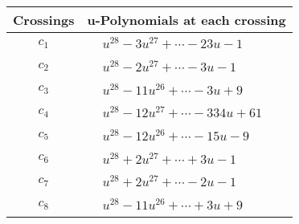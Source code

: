 \documentclass[1p]{elsarticle_modified}
\theoremstyle{definition}
\begin{document}
\begin{tabular}{m{50pt}|m{274pt}}
Crossings & \hspace{64pt}u-Polynomials at each crossing \\
\hline $$\begin{aligned}c_{1}\end{aligned}$$&$\begin{aligned}
&u^{28}-3 u^{27}+\cdots-23 u-1
\end{aligned}$\\
\hline $$\begin{aligned}c_{2}\end{aligned}$$&$\begin{aligned}
&u^{28}-2 u^{27}+\cdots-3 u-1
\end{aligned}$\\
\hline $$\begin{aligned}c_{3}\end{aligned}$$&$\begin{aligned}
&u^{28}-11 u^{26}+\cdots-3 u+9
\end{aligned}$\\
\hline $$\begin{aligned}c_{4}\end{aligned}$$&$\begin{aligned}
&u^{28}-12 u^{27}+\cdots-334 u+61
\end{aligned}$\\
\hline $$\begin{aligned}c_{5}\end{aligned}$$&$\begin{aligned}
&u^{28}-12 u^{26}+\cdots-15 u-9
\end{aligned}$\\
\hline $$\begin{aligned}c_{6}\end{aligned}$$&$\begin{aligned}
&u^{28}+2 u^{27}+\cdots+3 u-1
\end{aligned}$\\
\hline $$\begin{aligned}c_{7}\end{aligned}$$&$\begin{aligned}
&u^{28}+2 u^{27}+\cdots-2 u-1
\end{aligned}$\\
\hline $$\begin{aligned}c_{8}\end{aligned}$$&$\begin{aligned}
&u^{28}-11 u^{26}+\cdots+3 u+9
\end{aligned}$\\

\end{tabular}
\end{document}
